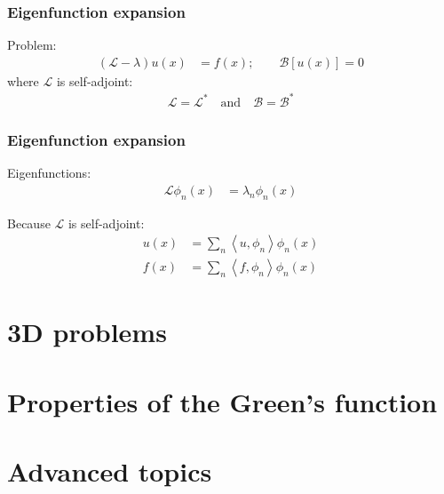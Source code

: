 \documentclass[12 pt, compress, handout, intlimits]{beamer}
\renewcommand{\L}{\mathcal{L}}
\renewcommand{\B}{\mathcal{B}}
\newcommand{\inprod}[2]{\left\langle {#1}, {#2} \right\rangle}
\renewcommand{\L}{\mathcal{L}}
\begin{document}
\note{}

\begin{frame}[fragile]
    \frametitle{Eigenfunction expansion}

    Problem:
    \begin{align*}
        \left( \L - \lambda \right)u(x) &= f(x); \qquad \B[u(x)] = 0
    \end{align*}
    where $ \L $ is self-adjoint:
    \begin{align*}
        \L = \L^* \quad \text{and} \quad \B = \B^*
    \end{align*}
    
\end{frame}

\note{}

\begin{frame}[fragile]
    \frametitle{Eigenfunction expansion}
    
    Eigenfunctions:
    \begin{align*}
        \L \phi_n(x) &= \lambda_n \phi_n(x)
    \end{align*}
    
    Because $ \L $ is self-adjoint:
    \begin{align*}
        u(x) &= \sum_n \inprod{u}{\phi_n} \phi_n(x)
        \\
        f(x) &= \sum_n \inprod{f}{\phi_n} \phi_n(x)
    \end{align*}
    

\end{frame}

\note{}

\section{3D problems}
\label{sec:3d_problems}

\note{}

\section{Properties of the Green's function}
\label{sec:properties_of_the_green_s_function}

\note{}

\section{Advanced topics}
\label{sec:advanced_topics}

\note{}
\end{document}
